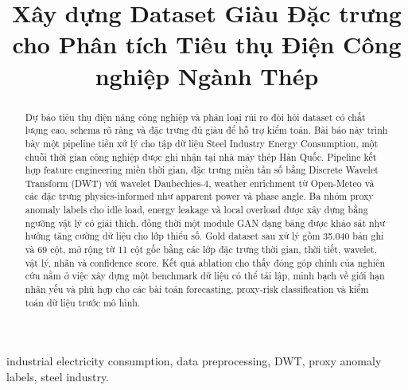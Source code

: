 \documentclass[conference]{IEEEtran}
\begin{document}
\title{Xây dựng Dataset Giàu Đặc trưng cho Phân tích Tiêu thụ Điện Công nghiệp Ngành Thép}

\author{
}

\maketitle

\begin{abstract}
Dự báo tiêu thụ điện năng công nghiệp và phân loại rủi ro đòi hỏi dataset có chất lượng cao, schema rõ ràng và đặc trưng đủ giàu để hỗ trợ kiểm toán. Bài báo này trình bày một pipeline tiền xử lý cho tập dữ liệu Steel Industry Energy Consumption, một chuỗi thời gian công nghiệp được ghi nhận tại nhà máy thép Hàn Quốc. Pipeline kết hợp feature engineering miền thời gian, đặc trưng miền tần số bằng Discrete Wavelet Transform (DWT) với wavelet Daubechies-4, weather enrichment từ Open-Meteo và các đặc trưng physics-informed như apparent power và phase angle. Ba nhóm proxy anomaly labels cho idle load, energy leakage và local overload được xây dựng bằng ngưỡng vật lý có giải thích, đồng thời một module GAN dạng bảng được khảo sát như hướng tăng cường dữ liệu cho lớp thiểu số. Gold dataset sau xử lý gồm 35.040 bản ghi và 69 cột, mở rộng từ 11 cột gốc bằng các lớp đặc trưng thời gian, thời tiết, wavelet, vật lý, nhãn và confidence score. Kết quả ablation cho thấy đóng góp chính của nghiên cứu nằm ở việc xây dựng một benchmark dữ liệu có thể tái lập, minh bạch về giới hạn nhãn yếu và phù hợp cho các bài toán forecasting, proxy-risk classification và kiểm toán dữ liệu trước mô hình.
\end{abstract}

\begin{IEEEkeywords}
industrial electricity consumption, data preprocessing, DWT, proxy anomaly labels, steel industry.
\end{IEEEkeywords}











\end{document}
